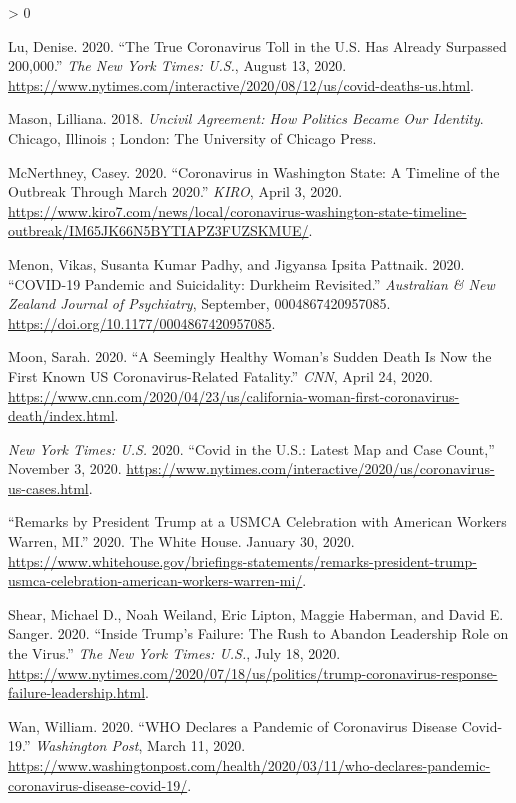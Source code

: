 \documentclass[
  12pt,
]{article}
\newlength{\cslhangindent}
\newenvironment{CSLReferences}[2] %
 {%
  \setlength{\parindent}{0pt}
  \ifodd #1 \everypar{\setlength{\hangindent}{\cslhangindent}}\ignorespaces\fi
  \ifnum #2 > 0
  \setlength{\parskip}{#2\baselineskip}
  \fi
 }%
 {}
\begin{document}
\begin{CSLReferences}{1}{0}
\leavevmode\hypertarget{ref-Lu2020}{}%
Lu, Denise. 2020. {``The {True Coronavirus Toll} in the {U}.{S}. {Has Already Surpassed} 200,000.''} \emph{The New York Times: U.S.}, August 13, 2020. \url{https://www.nytimes.com/interactive/2020/08/12/us/covid-deaths-us.html}.

\leavevmode\hypertarget{ref-Mason2018}{}%
Mason, Lilliana. 2018. \emph{Uncivil Agreement: How Politics Became Our Identity}. {Chicago, Illinois ; London}: {The University of Chicago Press}.

\leavevmode\hypertarget{ref-McNerthney2020}{}%
McNerthney, Casey. 2020. {``Coronavirus in {Washington} State: {A} Timeline of the Outbreak Through {March} 2020.''} \emph{KIRO}, April 3, 2020. \url{https://www.kiro7.com/news/local/coronavirus-washington-state-timeline-outbreak/IM65JK66N5BYTIAPZ3FUZSKMUE/}.

\leavevmode\hypertarget{ref-Menon2020}{}%
Menon, Vikas, Susanta Kumar Padhy, and Jigyansa Ipsita Pattnaik. 2020. {``{COVID}-19 Pandemic and Suicidality: {Durkheim} Revisited.''} \emph{Australian \& New Zealand Journal of Psychiatry}, September, 0004867420957085. \url{https://doi.org/10.1177/0004867420957085}.

\leavevmode\hypertarget{ref-Moon2020}{}%
Moon, Sarah. 2020. {``A Seemingly Healthy Woman's Sudden Death Is Now the First Known {US} Coronavirus-Related Fatality.''} \emph{CNN}, April 24, 2020. \url{https://www.cnn.com/2020/04/23/us/california-woman-first-coronavirus-death/index.html}.

\leavevmode\hypertarget{ref-nyt2020}{}%
\emph{New York Times: U.S.} 2020. {``Covid in the {U}.{S}.: {Latest Map} and {Case Count},''} November 3, 2020. \url{https://www.nytimes.com/interactive/2020/us/coronavirus-us-cases.html}.

\leavevmode\hypertarget{ref-whitehouse2020}{}%
{``Remarks by {President Trump} at a {USMCA Celebration} with {American Workers} \textbar{} {Warren}, {MI}.''} 2020. {The White House}. January 30, 2020. \url{https://www.whitehouse.gov/briefings-statements/remarks-president-trump-usmca-celebration-american-workers-warren-mi/}.

\leavevmode\hypertarget{ref-Shear2020}{}%
Shear, Michael D., Noah Weiland, Eric Lipton, Maggie Haberman, and David E. Sanger. 2020. {``Inside {Trump}'s {Failure}: {The Rush} to {Abandon Leadership Role} on the {Virus}.''} \emph{The New York Times: U.S.}, July 18, 2020. \url{https://www.nytimes.com/2020/07/18/us/politics/trump-coronavirus-response-failure-leadership.html}.

\leavevmode\hypertarget{ref-Wan2020}{}%
Wan, William. 2020. {``{WHO} Declares a Pandemic of Coronavirus Disease Covid-19.''} \emph{Washington Post}, March 11, 2020. \url{https://www.washingtonpost.com/health/2020/03/11/who-declares-pandemic-coronavirus-disease-covid-19/}.

\end{CSLReferences}
\end{document}
